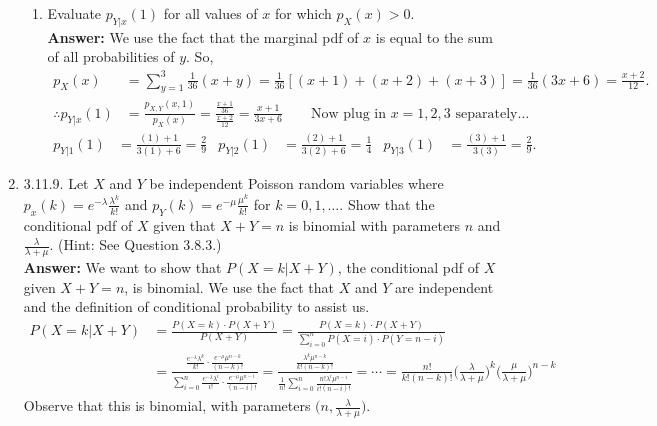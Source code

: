\documentclass{article}
\begin{document}
\begin{enumerate}
\begin{enumerate}
            \item Evaluate $p_{Y|x}(1)$ for all values of $x$ for which $p_X(x) > 0$.\\
            \textbf{Answer: }We use the fact that the marginal pdf of $x$ is equal to the sum of all probabilities of $y$. So,
                \begin{align*}
                    p_X(x) &= \sum_{y=1}^3 \frac{1}{36} (x+y) = \frac{1}{36}[(x+1)+(x+2)+(x+3)] = \frac{1}{36}(3x+6) = \frac{x+2}{12}.\\
                    \therefore p_{Y|x}(1) &= \frac{p_{X,Y} (x,1)}{p_X(x)} = \frac{\frac{x+1}{36}}{\frac{x+2}{12}} = \frac{x+1}{3x+6}\qquad \text{Now plug in $x=1,2,3$ separately\ldots}
                \end{align*}
                \begin{align*}
                    p_{Y|1}(1) &= \frac{(1)+1}{3(1)+6} = \frac{2}{9} &   p_{Y|2}(1) &= \frac{(2)+1}{3(2)+6} = \frac{1}{4}  &   p_{Y|3}(1) &= \frac{(3)+1}{3(3)} = \frac{2}{9}.
                \end{align*}
        \end{enumerate}

        \item 3.11.9. Let $X$ and $Y$ be independent Poisson random variables where $p_x(k) = e^{-\lambda} \frac{\lambda^k}{k!}$ and $p_Y (k) = e^{-\mu} \frac{\mu^k}{k!}$ for $k = 0, 1, \ldots$. Show that the conditional pdf of $X$ given that $X + Y = n$ is binomial with parameters $n$ and $\frac{\lambda}{\lambda+\mu}$. (Hint: See Question 3.8.3.)\\
        \textbf{Answer: }We want to show that $P(X=k|X+Y)$, the conditional pdf of $X$ given $X+Y=n$, is binomial. We use the fact that $X$ and $Y$ are independent and the definition of conditional probability to assist us.
            \begin{align*}
                P(X=k|X+Y) &= \frac{P(X=k) \cdot P(X+Y)}{P(X+Y)} = \frac{P(X=k) \cdot P(X+Y)}{\sum_{i=0}^n P(X = i) \cdot P(Y=n-i)}\\
                &= \frac{\frac{e^{-\lambda}\lambda^k}{k!} \cdot \frac{e^{-\mu}\mu^{n-k}}{(n-k)!}}{\sum_{i=0}^n  \frac{e^{-\lambda}\lambda^i}{i!} \cdot  \frac{e^{-\mu}\mu^{n-i}}{(n-i)!}} = \frac{\frac{\lambda^k \mu^{n-k}}{k!(n-k)!}}{\frac{1}{n!} \sum_{i=0}^n \frac{n!\lambda^i\mu^{n-i}}{i!(n-i)!}} = \cdots = \frac{n!}{k!(n-k)!}\bigg(\frac{\lambda}{\lambda+\mu}\bigg)^k\bigg(\frac{\mu}{\lambda+\mu}\bigg)^{n-k}
            \end{align*}
        Observe that this is binomial, with parameters $\big(n, \frac{\lambda}{\lambda+\mu}\big)$.\\
        

\end{enumerate}
\end{document}
